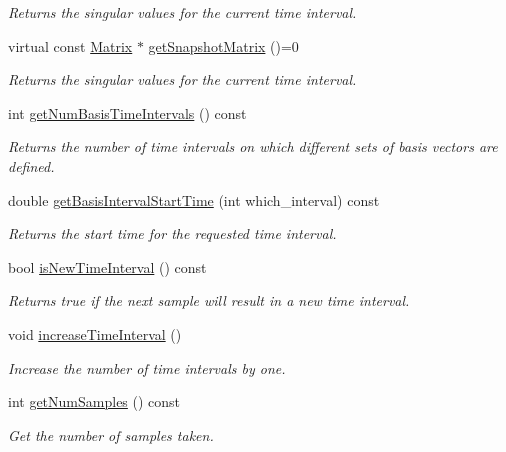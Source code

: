 \begin{DoxyCompactItemize}
\begin{DoxyCompactList}\small\item\em Returns the singular values for the current time interval. \end{DoxyCompactList}\item 
virtual const \hyperlink{class_c_a_r_o_m_1_1_matrix}{Matrix} $\ast$ \hyperlink{class_c_a_r_o_m_1_1_s_v_d_a96b482e76d8c8f7278008af4a0bebf85}{get\-Snapshot\-Matrix} ()=0
\begin{DoxyCompactList}\small\item\em Returns the singular values for the current time interval. \end{DoxyCompactList}\item 
int \hyperlink{class_c_a_r_o_m_1_1_s_v_d_a4f9403bd1c9720a5515601162fc4923d}{get\-Num\-Basis\-Time\-Intervals} () const 
\begin{DoxyCompactList}\small\item\em Returns the number of time intervals on which different sets of basis vectors are defined. \end{DoxyCompactList}\item 
double \hyperlink{class_c_a_r_o_m_1_1_s_v_d_a671897e97a4135de6c3b03c49fd7fa91}{get\-Basis\-Interval\-Start\-Time} (int which\-\_\-interval) const 
\begin{DoxyCompactList}\small\item\em Returns the start time for the requested time interval. \end{DoxyCompactList}\item 
bool \hyperlink{class_c_a_r_o_m_1_1_s_v_d_a5eef5eb6cefc3feb64eaebe9fa1ac5a6}{is\-New\-Time\-Interval} () const 
\begin{DoxyCompactList}\small\item\em Returns true if the next sample will result in a new time interval. \end{DoxyCompactList}\item 
\hypertarget{class_c_a_r_o_m_1_1_s_v_d_a447e456c110129eef1565023065dc87d}{void \hyperlink{class_c_a_r_o_m_1_1_s_v_d_a447e456c110129eef1565023065dc87d}{increase\-Time\-Interval} ()}\label{class_c_a_r_o_m_1_1_s_v_d_a447e456c110129eef1565023065dc87d}

\begin{DoxyCompactList}\small\item\em Increase the number of time intervals by one. \end{DoxyCompactList}\item 
\hypertarget{class_c_a_r_o_m_1_1_s_v_d_a899aa5ebfaf2e10e3d2eeae179f23cc4}{int \hyperlink{class_c_a_r_o_m_1_1_s_v_d_a899aa5ebfaf2e10e3d2eeae179f23cc4}{get\-Num\-Samples} () const }\label{class_c_a_r_o_m_1_1_s_v_d_a899aa5ebfaf2e10e3d2eeae179f23cc4}

\begin{DoxyCompactList}\small\item\em Get the number of samples taken. \end{DoxyCompactList}\end{DoxyCompactItemize}
